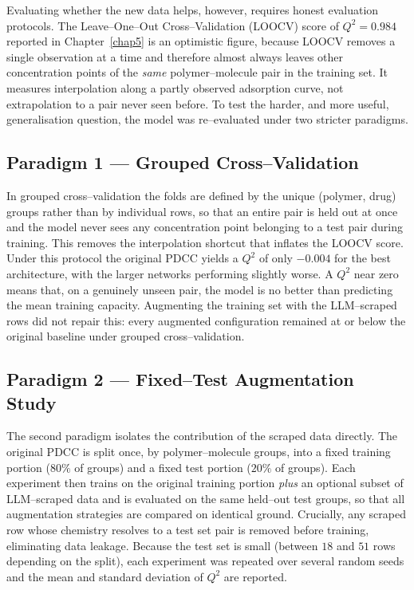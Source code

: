 Evaluating whether the new data helps, however, requires honest evaluation protocols. The Leave--One--Out Cross--Validation (LOOCV) score of $Q^2 = 0.984$ reported in Chapter~\ref{chap5} is an optimistic figure, because LOOCV removes a single observation at a time and therefore almost always leaves other concentration points of the \emph{same} polymer--molecule pair in the training set. It measures interpolation along a partly observed adsorption curve, not extrapolation to a pair never seen before. To test the harder, and more useful, generalisation question, the model was re--evaluated under two stricter paradigms.

\subsection{Paradigm 1 --- Grouped Cross--Validation}
\label{sec:cont_grouped}

In grouped cross--validation the folds are defined by the unique (polymer, drug) groups rather than by individual rows, so that an entire pair is held out at once and the model never sees any concentration point belonging to a test pair during training. This removes the interpolation shortcut that inflates the LOOCV score. Under this protocol the original PDCC yields a $Q^2$ of only $-0.004$ for the best architecture, with the larger networks performing slightly worse. A $Q^2$ near zero means that, on a genuinely unseen pair, the model is no better than predicting the mean training capacity. Augmenting the training set with the LLM--scraped rows did not repair this: every augmented configuration remained at or below the original baseline under grouped cross--validation.

\subsection{Paradigm 2 --- Fixed--Test Augmentation Study}
\label{sec:cont_fixedtest}

The second paradigm isolates the contribution of the scraped data directly. The original PDCC is split once, by polymer--molecule groups, into a fixed training portion ($80\%$ of groups) and a fixed test portion ($20\%$ of groups). Each experiment then trains on the original training portion \emph{plus} an optional subset of LLM--scraped data and is evaluated on the same held--out test groups, so that all augmentation strategies are compared on identical ground. Crucially, any scraped row whose chemistry resolves to a test set pair is removed before training, eliminating data leakage. Because the test set is small (between $18$ and $51$ rows depending on the split), each experiment was repeated over several random seeds and the mean and standard deviation of $Q^2$ are reported.

